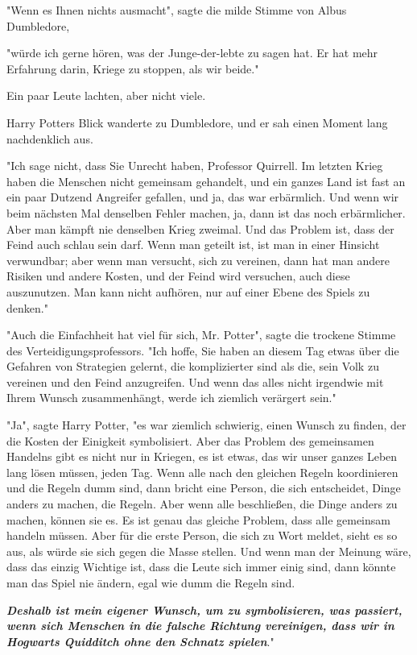 {"Wenn es Ihnen nichts ausmacht", sagte die milde Stimme von Albus Dumbledore,

"würde ich gerne hören, was der Junge-der-lebte zu sagen hat. Er hat mehr Erfahrung darin, Kriege zu stoppen, als wir beide."

Ein paar Leute lachten, aber nicht viele.

Harry Potters Blick wanderte zu Dumbledore, und er sah einen Moment lang nachdenklich aus.

"Ich sage nicht, dass Sie Unrecht haben, Professor Quirrell. Im letzten Krieg haben die Menschen nicht gemeinsam gehandelt, und ein ganzes Land ist fast an ein paar Dutzend Angreifer gefallen, und ja, das war erbärmlich. Und wenn wir beim nächsten Mal denselben Fehler machen, ja, dann ist das noch erbärmlicher. Aber man kämpft nie denselben Krieg zweimal. Und das Problem ist, dass der Feind auch schlau sein darf. Wenn man geteilt ist, ist man in einer Hinsicht verwundbar; aber wenn man versucht, sich zu vereinen, dann hat man andere Risiken und andere Kosten, und der Feind wird versuchen, auch diese auszunutzen. Man kann nicht aufhören, nur auf einer Ebene des Spiels zu denken."

"Auch die Einfachheit hat viel für sich, Mr. Potter", sagte die trockene Stimme des Verteidigungsprofessors. "Ich hoffe, Sie haben an diesem Tag etwas über die Gefahren von Strategien gelernt, die komplizierter sind als die, sein Volk zu vereinen und den Feind anzugreifen. Und wenn das alles nicht irgendwie mit Ihrem Wunsch zusammenhängt, werde ich ziemlich verärgert sein."

"Ja", sagte Harry Potter, "es war ziemlich schwierig, einen Wunsch zu finden, der die Kosten der Einigkeit symbolisiert. Aber das Problem des gemeinsamen Handelns gibt es nicht nur in Kriegen, es ist etwas, das wir unser ganzes Leben lang lösen müssen, jeden Tag. Wenn alle nach den gleichen Regeln koordinieren und die Regeln dumm sind, dann bricht eine Person, die sich entscheidet, Dinge anders zu machen, die Regeln. Aber wenn alle beschließen, die Dinge anders zu machen, können sie es. Es ist genau das gleiche Problem, dass alle gemeinsam handeln müssen. Aber für die erste Person, die sich zu Wort meldet, sieht es so aus, als würde sie sich gegen die Masse stellen. Und wenn man der Meinung wäre, dass das einzig Wichtige ist, dass die Leute sich immer einig sind, dann könnte man das Spiel nie ändern, egal wie dumm die Regeln sind.

\textbf{\emph{Deshalb ist mein eigener Wunsch, um zu symbolisieren, was passiert, wenn sich Menschen in die falsche Richtung vereinigen, dass wir in Hogwarts Quidditch ohne den Schnatz spielen}}."

}
